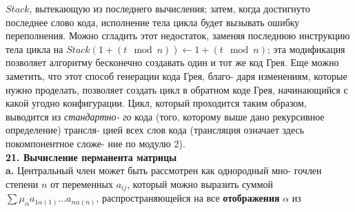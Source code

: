 $Stack$, вытекающую из последнего вычисления; затем, когда достигнуто\linebreak
последнее слово кода, исполнение тела цикла будет вызывать ошибку\linebreak
переполнения. Можно сгладить этот недостаток, заменяя последнюю\linebreak
инструкцию тела цикла на $Stack(1+(t\mod{n}))\longleftarrow 1+(t\mod{n})$; эта\linebreak
модификация позволяет алгоритму бесконечно создавать один и тот\linebreak
же код Грея.\newline
\hspace*{15pt}Еще можно заметить, что этот способ генерации кода Грея, благо-\linebreak
даря изменениям, которые нужно проделать, позволяет создать цикл\linebreak
в обратном коде Грея, начинающийся с какой угодно конфигурации.\linebreak
Цикл, который проходится таким образом, выводится из \textit{стандартно-}\linebreak
\textit{го} кода (того, которому выше дано рекурсивное определение) трансля-\linebreak
цией всех слов кода (трансляция означает здесь покомпонентное сложе-\linebreak
ние по модулю 2).\\

\noindent\textbf{21. Вычисление перманента матрицы}\\

\textbf{a.} Центральный член может быть рассмотрен как однородный мно-\linebreak
гочлен степени $n$ от переменных $a_{ij}$, который можно выразить суммой\linebreak
$\sum\mu_{\alpha}a_{1\alpha(1)}...a_{n\alpha(n)}$, распространяющейся на все \textbf{отображения} $\alpha$ из
\newpage


